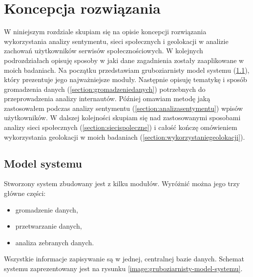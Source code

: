 \chapter{Koncepcja rozwiązania}

W niniejszym rozdziale skupiam się na opisie koncepcji rozwiązania wykorzystania
analizy sentymentu, sieci społecznych i geolokacji w analizie zachowań
użytkowników serwisów społecznościowych. W kolejnych podrozdziałach opisuję
sposoby w jaki dane zagadnienia zostały zaaplikowane w moich badaniach.
Na początku przedstawiam gruboziarnisty model systemu (\ref{section:modelsystemu}),
który prezentuje jego najważniejsze moduły. Następnie opisuję tematykę
i sposób gromadzenia danych (\ref{section:gromadzeniedanych}) potrzebnych do 
przeprowadzenia analizy internautów. Później omawiam metodę jaką zastosowałem 
podczas analizy sentymentu (\ref{section:analizasentymentu}) wpisów użytkowników.
W dalszej kolejności skupiam się nad zastosowanymi
sposobami analizy sieci społecznych (\ref{section:siecispoleczne})
i całość kończę omówieniem wykorzystania geolokacji w moich badaniach 
(\ref{section:wykorzystaniegeolokacji}).








\section{Model systemu}
\label{section:modelsystemu}
Stworzony system zbudowany jest z kilku modułów. Wyróżnić można jego
trzy główne części:
\begin{itemize}
  \item gromadzenie danych,
  \item przetwarzanie danych,
  \item analiza zebranych danych.
\end{itemize} 
Wszystkie informacje zapisywanie są w jednej, centralnej bazie danych.
Schemat systemu zaprezentowany jest na rysunku 
\ref{image:gruboziarnisty-model-systemu}.


\clearpage

